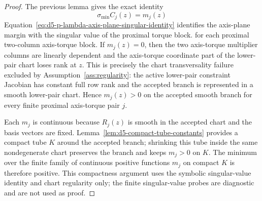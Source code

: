 \documentclass[preprint,12pt]{elsarticle}
\begin{document}
\begin{proof}
The previous lemma gives the exact identity
\begin{equation}
\label{eq:d5-p-lambda-axis-plane-singular-identity}
  \sigma_{\min} C_j(z)=m_j(z)
\end{equation}
Equation~\eqref{eq:d5-p-lambda-axis-plane-singular-identity} identifies the
axis-plane margin with the singular value of the proximal torque block.
for each proximal two-column axis-torque block.  If \(m_j(z)=0\), then the
two axis-torque multiplier columns are linearly dependent and the
axis-torque coordinate part of the lower-pair chart loses rank at \(z\).
This is precisely the chart transversality failure excluded by
Assumption~\ref{ass:regularity}: the active lower-pair constraint Jacobian has
constant full row rank and the accepted branch is represented in a smooth
lower-pair chart.  Hence \(m_j(z)>0\) on the accepted smooth branch for every
finite proximal axis-torque pair \(j\).

Each \(m_j\) is continuous because \(R_j(z)\) is smooth in the accepted chart
and the basis vectors are fixed.  Lemma~\ref{lem:d5-compact-tube-constants}
provides a compact tube \(K\) around the accepted branch; shrinking this tube
inside the same nondegenerate chart preserves the branch and keeps
\(m_j>0\) on \(K\).  The minimum over the finite family of continuous
positive functions \(m_j\) on compact \(K\) is therefore positive.  This
compactness argument uses the symbolic singular-value identity and chart
regularity only; the finite singular-value probes are diagnostic and are not
used as proof.
\end{proof}
\end{document}
